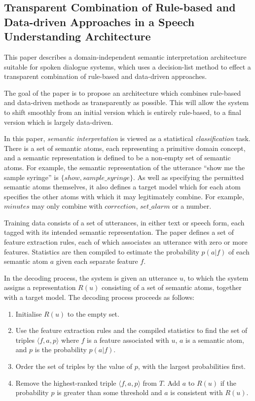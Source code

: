 \subsection{Transparent Combination of Rule-based and Data-driven Approaches in a Speech Understanding Architecture \cite{Rayner2003}}

This paper describes a domain-independent semantic interpretation architecture suitable for spoken dialogue systems, which uses a decision-list method to effect a transparent combination of rule-based and data-driven approaches.

The goal of the paper is to propose an architecture which combines rule-based and data-driven methods as transparently as possible. This will allow the system to shift smoothly from an initial version which is entirely rule-based, to a final version which is largely data-driven.

In this paper, \emph{semantic interpretation} is viewed as a statistical \emph{classification} task. There is a set of semantic atoms, each representing a primitive domain concept, and a semantic representation is defined to be a non-empty set of semantic atoms. For example, the semantic representation of the utterance ``show me the sample syringe'' is $\{show, sample\_syringe\}$. As well as specifying the permitted semantic atoms themselves, it also defines a target model which for each atom specifies the other atoms with which it may legitimately combine. For example, $minutes$ may only combine with $correction$, $set\_alarm$ or a number.

Training data consists of a set of utterances, in either text or speech form, each tagged with its intended semantic representation. The paper defines a set of feature extraction rules, each of which associates an utterance with zero or more features. Statistics are then compiled to estimate the probability $p(a | f)$ of each semantic atom $a$ given each separate feature $f$.

In the decoding process, the system is given an utterance $u$, to which the system assigns a representation $R(u)$ consisting of a set of semantic atoms, together with a target model. The decoding process  proceeds as follows:
\begin{enumerate}
\item Initialise $R(u)$ to the empty set.
\item Use the feature extraction rules and the compiled statistics to find the set of triples $\langle f, a, p \rangle$ where $f$ is a feature associated with $u$, $a$ is a semantic atom, and $p$ is the probability $p(a | f)$.
\item Order the set of triples by the value of $p$, with the largest probabilities first.
\item Remove the highest-ranked triple $\langle f,a,p \rangle$ from $T$. Add $a$ to $R(u)$ if the probability $p$ is greater than some threshold and $a$ is consistent with $R(u)$.
\end{enumerate}

